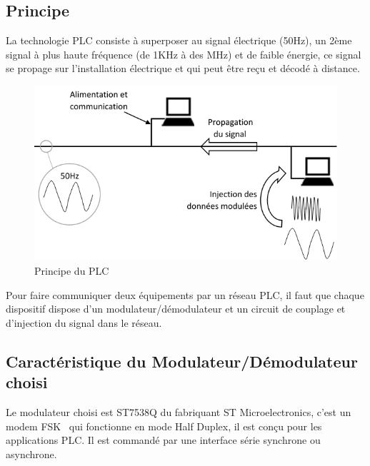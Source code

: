 \documentclass[11pt, a4paper, twoside]{book}
\begin{document}
\subsection{Principe}
La technologie PLC consiste à superposer au signal électrique (50Hz), un 2ème signal à plus haute fréquence (de 1KHz à des MHz) et de faible énergie, ce signal se propage sur l'installation électrique et qui peut être reçu et décodé à distance.
\begin{figure}[H]
\centering
\includegraphics[width=\textwidth]{PLC}
\caption{Principe du PLC}
\end{figure}
Pour faire communiquer deux équipements par un réseau PLC, il faut que chaque dispositif dispose d’un modulateur/démodulateur et un circuit de couplage et d'injection du signal dans le réseau.
\subsection{Caractéristique du Modulateur/Démodulateur choisi}
Le modulateur choisi est ST7538Q du fabriquant ST Microelectronics, c'est un modem FSK
\footnotemark \ qui fonctionne en mode Half Duplex, il est conçu pour les applications PLC. Il est commandé par une interface série synchrone ou asynchrone.\\
\end{document}
